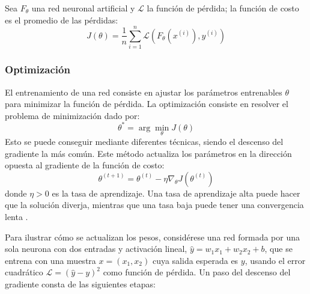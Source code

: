 \begin{definition}
	
	Sea $F_\theta$ una red neuronal artificial y $\mathcal{L}$ la función de pérdida; la función de costo es el promedio de las pérdidas:
	\[
	J(\theta) = \frac{1}{n} \sum_{i = 1}^{n} \mathcal{L}(F_\theta(x^{(i)}), y^{(i)})
	\]
\end{definition}

\subsubsection{Optimización}

El entrenamiento de una red consiste en ajustar los parámetros entrenables $\theta$ para minimizar la función de pérdida. La optimización consiste en resolver el problema de minimización dado por:
\[
\theta^* = \arg \min_{\theta} J(\theta)
\]
Esto se puede conseguir mediante diferentes técnicas, siendo el descenso del gradiente la más común. Este método actualiza los parámetros en la dirección opuesta al gradiente de la función de costo:
\[
\theta^{(t + 1)} = \theta^{(t)} - \eta \nabla_\theta J(\theta^{(t)})
\]
donde $\eta >0$ es la tasa de aprendizaje. Una tasa de aprendizaje alta puede hacer que la solución diverja, mientras que una tasa baja puede tener una convergencia lenta \cite{matich2001_ann}. 

Para ilustrar cómo se actualizan los pesos, considérese una red formada por una sola neurona con dos entradas y activación lineal, $\hat{y} = w_1 x_1 + w_2 x_2 + b$, que se entrena con una muestra $x = (x_1, x_2)$ cuya salida esperada es $y$, usando el error cuadrático $\mathcal{L} = (\hat{y} - y)^2$ como función de pérdida. Un paso del descenso del gradiente consta de las siguientes etapas:

